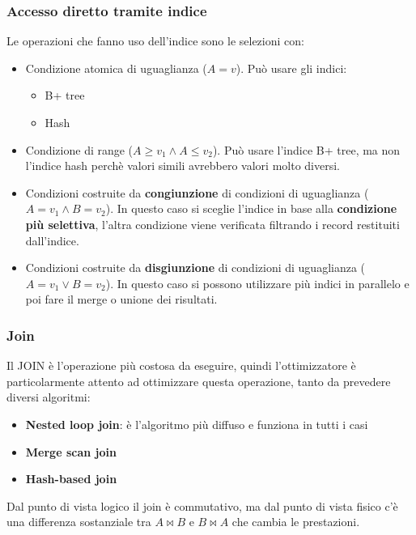 \documentclass[a4paper]{article}
\begin{document}
\subsubsection{Accesso diretto tramite indice}
Le operazioni che fanno uso dell'indice sono le selezioni con:
\begin{itemize}
  \item Condizione atomica di uguaglianza (\( A = v \)). Può usare gli indici:
    \begin{itemize}
      \item B+ tree
      \item Hash
    \end{itemize}

  \item Condizione di range (\( A \ge v_1 \land A \le v_2 \)). Può usare l'indice
    B+ tree, ma non l'indice hash perchè valori simili avrebbero valori molto diversi.

  \item Condizioni costruite da \textbf{congiunzione} di condizioni di uguaglianza
    (\( A = v_1 \land B = v_2 \)). In questo caso si sceglie l'indice in base alla
    \textbf{condizione più selettiva}, l'altra condizione viene verificata
    filtrando i record restituiti dall'indice.

  \item Condizioni costruite da \textbf{disgiunzione} di condizioni di uguaglianza
    (\( A = v_1 \lor B = v_2 \)). In questo caso si possono utilizzare più
    indici in parallelo e poi fare il merge o unione dei risultati.
\end{itemize}

\subsubsection{Join}
Il JOIN è l'operazione più costosa da eseguire, quindi l'ottimizzatore è particolarmente
attento ad ottimizzare questa operazione, tanto da prevedere diversi algoritmi:
\begin{itemize}
  \item \textbf{Nested loop join}: è l'algoritmo più diffuso e funziona in tutti i casi
  \item \textbf{Merge scan join}
  \item \textbf{Hash-based join}
\end{itemize}
Dal punto di vista logico il join è commutativo, ma dal punto di vista fisico c'è
una differenza sostanziale tra \( A \bowtie B \) e \( B \bowtie A \) che cambia
le prestazioni.
\end{document}
